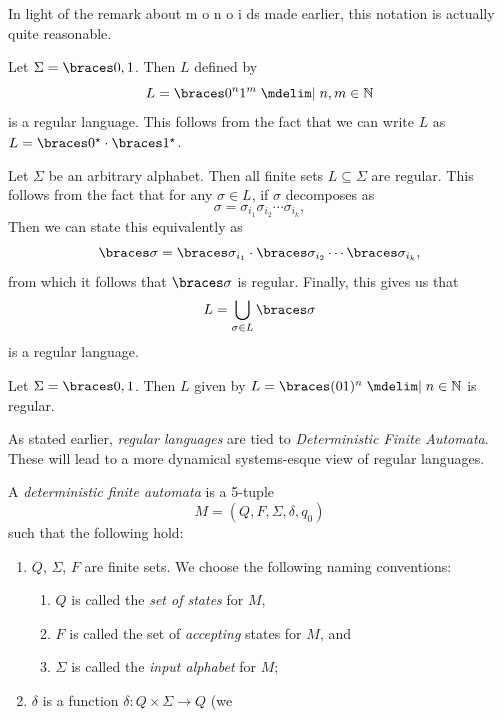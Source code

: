 \documentclass{fkpaper}
\begin{document}
\begin{multicols}{2}
\begin{definition}
\[  \]
\end{definition}
In light of the remark about {\color{red} m} {\color{orange} o}
{\color{yellow} n} {\color{green} o} {\color{blue} i} {\color{purple}
  d}s made earlier, this notation is actually quite reasonable.
\begin{example}\label{ex:dfa-example}
  Let $\Sigma = \set{0,1}$. Then $L$ defined by
  \[
    L = \set{0^n 1^m \MID n,m \in \NN}
  \]
  is a regular language. This follows from the fact that we can write
  $L$ as $L = \set{0}^\star \cdot \set{1}^\star$.
\end{example}
\begin{example}
  Let $\Sigma$ be an arbitrary alphabet. Then all finite sets $L
  \subseteq \Sigma$ are regular. This follows from the fact that for
  any $\sigma\in L$, if $\sigma$ decomposes as
  \[
    \sigma = \sigma_{i_1} \sigma_{i_2} \cdots \sigma_{i_k},
  \]
  Then we can state this equivalently as
  \[
    \set{\sigma} = \set{\sigma_{i_1}} \cdot \set{\sigma_{i_2}} \cdots
    \set{\sigma_{i_k}},
  \]
  from which it follows that $\set{\sigma}$ is regular. Finally, this
  gives us that
  \[
    L = \bigcup_{\sigma \in L} \set{\sigma}
  \]
  is a regular language.
\end{example}
\begin{example}
  Let $\Sigma = \set{0,1}$. Then $L$ given by $L = \set{(01)^n \MID n
    \in \NN}$ is regular.
\end{example}
As stated earlier, \emph{regular languages} are tied to
\emph{Deterministic Finite Automata}. These will lead to a more
dynamical systems-esque view of regular languages.
\begin{definition}
  A \emph{deterministic finite automata} is a 5-tuple
  \[
    M = (Q, F, \Sigma, \delta, q_0)
  \]
  such that the following hold:
  \begin{enumerate}
    \item $Q$, $\Sigma$, $F$ are finite sets. We choose the following
      naming conventions:
      \begin{enumerate}[label=\roman*)]
        \item $Q$ is called the \emph{set of states} for $M$,
        \item $F$ is called the set of \emph{accepting} states for
          $M$, and
        \item $\Sigma$ is called the \emph{input alphabet} for $M$;
      \end{enumerate}
    \item $\delta$ is a function $\delta : Q \times \Sigma \to Q$ (we

\end{enumerate}
\end{definition}
\end{multicols}
\end{document}
